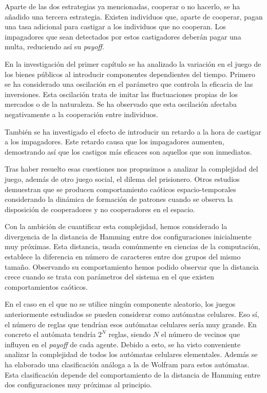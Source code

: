 Aparte de las dos estrategias ya mencionadas, cooperar o no hacerlo, se ha añadido una tercera estrategia. Existen individuos que, aparte de cooperar, pagan una tasa adicional para castigar a los individuos que no cooperan. Los impagadores que sean detectados por estos castigadores deberán pagar una multa, reduciendo así su \textit{payoff}.

En la investigación del primer capítulo se ha analizado la variación en el juego de los bienes públicos al introducir componentes dependientes del tiempo. Primero se ha considerado una oscilación en el parámetro que controla la eficacia de las inversiones. Esta oscilación trata de imitar las fluctuaciones propias de los mercados o de la naturaleza. Se ha observado que esta oscilación afectaba negativamente a la cooperación entre individuos. 

También se ha investigado el efecto de introducir un retardo a la hora de castigar a los impagadores. Este retardo causa que los impagadores aumenten, demostrando así que los castigos más eficaces son aquellos que son inmediatos.

Tras haber resuelto esas cuestiones nos propusimos a analizar la complejidad del juego, además de otro juego social, el dilema del prisionero. Otros estudios demuestran que se producen comportamiento caóticos espacio-temporales considerando la dinámica de formación de patrones cuando se observa la disposición de cooperadores y no cooperadores en el espacio. 

Con la ambición de cuantificar esta complejidad, hemos considerado la divergencia de la distancia de Hamming entre dos configuraciones inicialmente muy próximas. Esta distancia, usada comúnmente en ciencias de la computación, establece la diferencia en número de caracteres entre dos grupos del mismo tamaño. Observando su comportamiento hemos podido observar que la distancia crece cuando se trata con parámetros del sistema en el que existen comportamientos caóticos.

En el caso en el que no se utilice ningún componente aleatorio, los juegos anteriormente estudiados se pueden considerar como autómatas celulares. Eso sí, el número de reglas que tendrían esos autómatas celulares sería muy grande. En concreto el autómata tendría $2^N$ reglas, siendo $N$ el número de vecinos que influyen en el \textit{payoff} de cada agente. Debido a esto, se ha visto conveniente analizar la complejidad de todos los autómatas celulares elementales. Además se ha elaborado una clasificación análoga a la de Wolfram para estos autómatas. Esta clasificación depende del comportamiento de la distancia de Hamming entre dos configuraciones muy próximas al principio.

